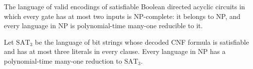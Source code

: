 \begin{theorem}
\label{BoolCircuit.dagCktSatLang_NPComplete}
\leanok
{}
The language of valid encodings of satisfiable Boolean directed acyclic circuits in
which every gate has at most two inputs is NP-complete: it belongs to NP, and every
language in NP is polynomial-time many-one reducible to it.
\end{theorem}

\begin{theorem}
\label{Complexity.SAT3_NPHard_viaCircuits}
\leanok
{}
Let $\mathrm{SAT}_3$ be the language of bit strings whose decoded CNF formula is
satisfiable and has at most three literals in every clause. Every language in NP has a
polynomial-time many-one reduction to $\mathrm{SAT}_3$.
\end{theorem}
